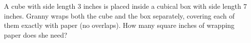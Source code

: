 A cube with side length $3$ inches is placed inside a cubical box with side length $7$ inches. Granny wraps both the cube and the box separately, covering each of them exactly with paper (no overlaps). How many square inches of wrapping paper does she need?
